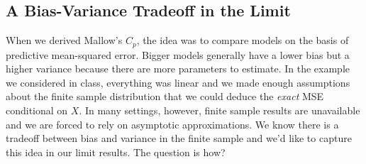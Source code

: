 \subsection{A Bias-Variance Tradeoff in the Limit}
When we derived Mallow's $C_p$, the idea was to compare models on the basis of predictive mean-squared error. 
Bigger models generally have a lower bias but a higher variance because there are more parameters to estimate. 
In the example we considered in class, everything was linear and we made enough assumptions about the finite sample distribution that we could deduce the \emph{exact} MSE conditional on $X$. 
In many settings, however, finite sample results are unavailable and we are forced to rely on asymptotic approximations. 
We know there is a tradeoff between bias and variance in the finite sample and we'd like to capture this idea in our limit results. 
The question is how?

